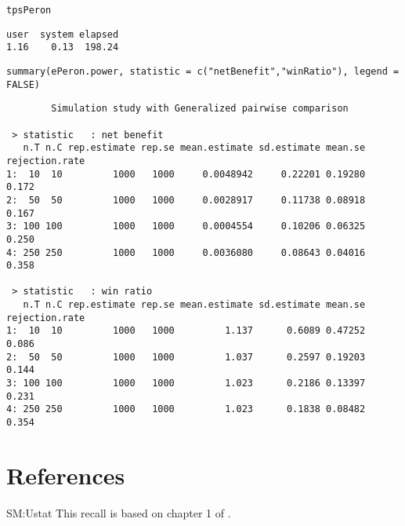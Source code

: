 \documentclass[12pt]{article}
\begin{document}
\lstset{language=r,label= ,caption= ,captionpos=b,numbers=none}
\begin{lstlisting}
tpsPeron
\end{lstlisting}

\begin{verbatim}
user  system elapsed 
1.16    0.13  198.24
\end{verbatim}

\lstset{language=r,label= ,caption= ,captionpos=b,numbers=none}
\begin{lstlisting}
summary(ePeron.power, statistic = c("netBenefit","winRatio"), legend = FALSE)
\end{lstlisting}

\begin{verbatim}
        Simulation study with Generalized pairwise comparison

 > statistic   : net benefit
   n.T n.C rep.estimate rep.se mean.estimate sd.estimate mean.se rejection.rate
1:  10  10         1000   1000     0.0048942     0.22201 0.19280          0.172
2:  50  50         1000   1000     0.0028917     0.11738 0.08918          0.167
3: 100 100         1000   1000     0.0004554     0.10206 0.06325          0.250
4: 250 250         1000   1000     0.0036080     0.08643 0.04016          0.358

 > statistic   : win ratio
   n.T n.C rep.estimate rep.se mean.estimate sd.estimate mean.se rejection.rate
1:  10  10         1000   1000         1.137      0.6089 0.47252          0.086
2:  50  50         1000   1000         1.037      0.2597 0.19203          0.144
3: 100 100         1000   1000         1.023      0.2186 0.13397          0.231
4: 250 250         1000   1000         1.023      0.1838 0.08482          0.354
\end{verbatim}

\clearpage

\section{References}
\label{sec:orgcffd4f1}
\begingroup
\renewcommand{\section}[2]{}



\endgroup

\clearpage

\appendix

\section{Recall on the U-statistic theory}
\label{SM:Ustat}
This recall is based on chapter 1 of \cite{lee1990u}.
\end{document}
